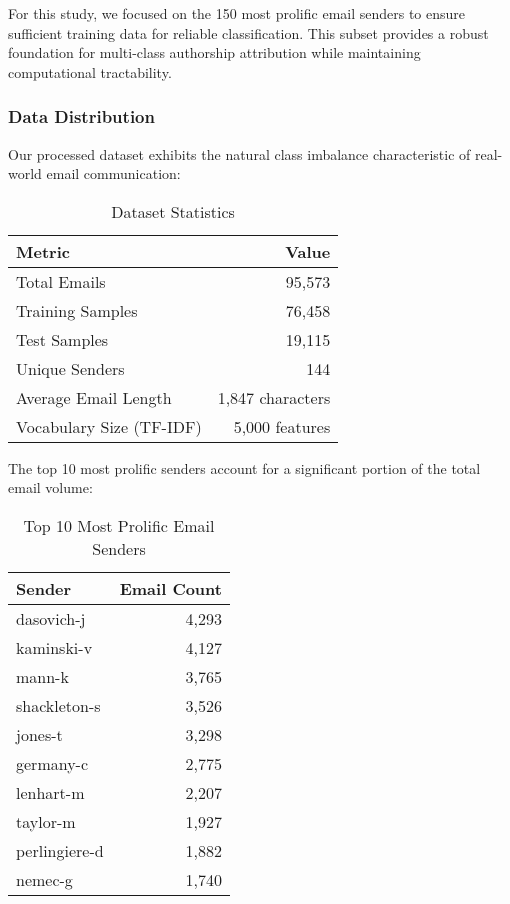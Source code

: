 \documentclass[11pt,a4paper]{article}
\begin{document}
For this study, we focused on the 150 most prolific email senders to ensure sufficient training data for reliable classification. This subset provides a robust foundation for multi-class authorship attribution while maintaining computational tractability.

\subsubsection{Data Distribution}

Our processed dataset exhibits the natural class imbalance characteristic of real-world email communication:

\begin{table}[H]
    \centering
    \caption{Dataset Statistics}
    \begin{tabular}{@{}lr@{}}
        \toprule
        \textbf{Metric} & \textbf{Value} \\
        \midrule
        Total Emails & 95,573 \\
        Training Samples & 76,458 \\
        Test Samples & 19,115 \\
        Unique Senders & 144 \\
        Average Email Length & 1,847 characters \\
        Vocabulary Size (TF-IDF) & 5,000 features \\
        \bottomrule
    \end{tabular}
\end{table}

The top 10 most prolific senders account for a significant portion of the total email volume:

\begin{table}[H]
    \centering
    \caption{Top 10 Most Prolific Email Senders}
    \begin{tabular}{@{}lr@{}}
        \toprule
        \textbf{Sender} & \textbf{Email Count} \\
        \midrule
        dasovich-j & 4,293 \\
        kaminski-v & 4,127 \\
        mann-k & 3,765 \\
        shackleton-s & 3,526 \\
        jones-t & 3,298 \\
        germany-c & 2,775 \\
        lenhart-m & 2,207 \\
        taylor-m & 1,927 \\
        perlingiere-d & 1,882 \\
        nemec-g & 1,740 \\
        \bottomrule
    \end{tabular}
\end{table}
\end{document}
